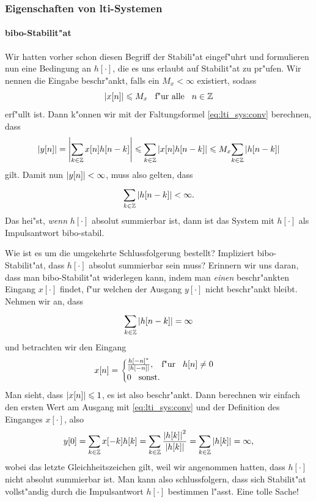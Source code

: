 \subsubsection{Eigenschaften von \texorpdfstring{\acrshort{lti}}{LTI}-Systemen}
%
\paragraph{\texorpdfstring{\gls{bibo}}{BIBO}-Stabilit"at}
Wir hatten vorher schon diesen Begriff der Stabili"at eingef"uhrt und formulieren nun eine Bedingung an $h[\cdot]$, die es uns erlaubt auf Stabilit"at zu pr"ufen.
Wir nennen die Eingabe beschr"ankt, falls ein $M_x < \infty$ existiert, sodass
\[
{\left| x[n] \right|} \leqslant M_x {\hspace{3mm} \text{f"ur alle} \hspace{3mm}} n \in \mathbb{Z}
\]
erf"ullt ist.
Dann k"onnen wir mit der Faltungsformel \eqref{eq:lti_sys:conv} berechnen, dass
\[
{\left| y[n] \right|} 
    = {\left| {\sum\limits_{k\in\mathbb{Z}}^{}{x[n] h[n-k]}} \right|} 
    \leqslant {\sum\limits_{k\in\mathbb{Z}}^{}{{\left| x[n] h[n-k] \right|}}} 
    \leqslant M_x {\sum\limits_{k\in\mathbb{Z}}^{}{{\left| h[n-k] \right|}}} 
\]
gilt.
Damit nun ${\left| y[n] \right|} < \infty$, muss also gelten, dass
\[
    {\sum\limits_{k\in\mathbb{Z}}^{}{{\left| h[n-k] \right|}}} < \infty.
\]
Das hei"st, \emph{wenn} $h[\cdot]$ absolut summierbar ist, dann ist das System mit $h[\cdot]$ als Impulsantwort \gls{bibo}-stabil.

Wie ist es um die umgekehrte Schlussfolgerung bestellt?
Impliziert \gls{bibo}-Stabilit"at, dass $h[\cdot]$ absolut summierbar sein muss?
Erinnern wir uns daran, dass man \gls{bibo}-Stabilit"at widerlegen kann, indem man \emph{einen} beschr"ankten Eingang $x[\cdot]$ findet, f"ur welchen der Ausgang $y[\cdot]$ nicht beschr"ankt bleibt.
Nehmen wir an, dass 
\[
{\sum\limits_{k\in\mathbb{Z}}^{}{{\left| h[n-k] \right|}}} = \infty
\]
und betrachten wir den Eingang
\[
x[n] = \begin{cases}
    \frac{h[-n]^\ast}{{\left| h[-n] \right|}}, {\hspace{3mm} \text{f"ur} \hspace{3mm}} h[n] \neq 0 \\
    0 {\hspace{3mm} \text{sonst.} \hspace{3mm}}
\end{cases}
\]
Man sieht, dass ${\left| x[n] \right|} \leqslant 1$, es ist also beschr"ankt.
Dann berechnen wir einfach den ersten Wert am Ausgang mit \eqref{eq:lti_sys:conv} und der Definition des Einganges $x[\cdot]$, also
\[
y[0] 
    = {\sum\limits_{k\in\mathbb{Z}}^{}{x[-k] h[k]}}
    = {\sum\limits_{k\in\mathbb{Z}}^{}{
        \frac{{\left| h[k] \right|}^2}{{\left| h[k] \right|}}
    }}
    = {\sum\limits_{k\in\mathbb{Z}}^{}{
        {\left| h[k] \right|}
    }}
    = \infty,
\]
wobei das letzte Gleichheitszeichen gilt, weil wir angenommen hatten, dass $h[\cdot]$ nicht absolut summierbar ist.
Man kann also schlussfolgern, dass sich Stabilit"at vollst"andig durch die Impulsantwort $h[\cdot]$ bestimmen l"asst.
Eine tolle Sache!
%
